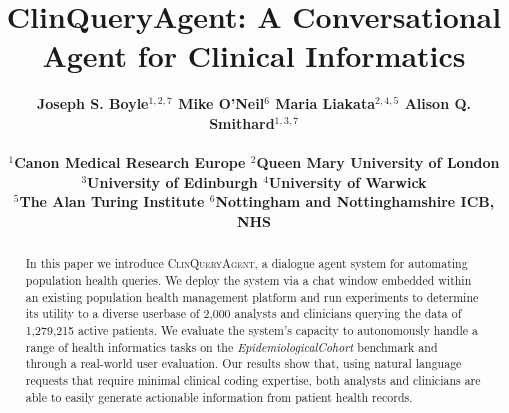 \documentclass[11pt]{article}
\title{ClinQueryAgent: A Conversational Agent for Clinical Informatics}
\author{ \bf
Joseph S. Boyle$^{1,2,7}$ 
Mike O'Neil$^{6}$
Maria Liakata$^{2,4,5}$
Alison Q. Smithard$^{1,3,7}$
\\ \\

$^1$Canon Medical Research Europe $^2$Queen Mary University of London \\ $^3$University of Edinburgh $^4$University of Warwick \\
$^5$The Alan Turing Institute $^6$Nottingham and Nottinghamshire ICB, NHS 
}
\begin{document}



\maketitle
\begin{abstract}
In this paper we introduce \textsc{ClinQueryAgent}, a dialogue agent system for automating population health queries. We deploy the system via a chat window embedded within an existing population health management platform and run experiments to determine its utility to a diverse userbase of 2,000 analysts and clinicians querying the data of 1,279,215 active patients. We evaluate the system's capacity to autonomously handle a range of health informatics tasks on the \textit{EpidemiologicalCohort} benchmark and through a real-world user evaluation. Our results show that, using natural language requests that require minimal clinical coding expertise, both analysts and clinicians are able to easily generate actionable information from patient health records.




\end{abstract}
\end{document}
